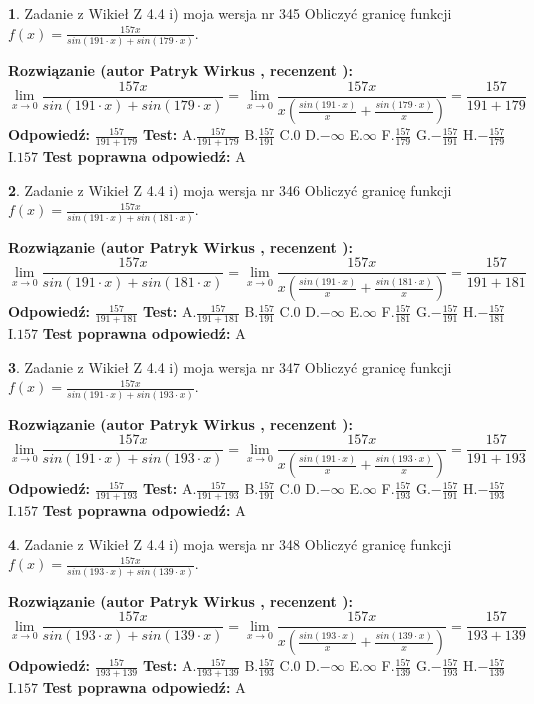 \documentclass[12pt, a4paper]{article}
\theoremstyle{definition} %
\newtheorem{zad}{}
\newcommand{\zadStart}[1]{\begin{zad}#1\newline}
\newcommand{\zadStop}{\end{zad}}
\newcommand{\rozwStart}[2]{\noindent \textbf{Rozwiązanie (autor #1 , recenzent #2): }\newline}
\newcommand{\rozwStop}{\newline}
\newcommand{\odpStart}{\noindent \textbf{Odpowiedź:}\newline}
\newcommand{\odpStop}{\newline}
\newcommand{\testStart}{\noindent \textbf{Test:}\newline}
\newcommand{\testStop}{\newline}
\newcommand{\kluczStart}{\noindent \textbf{Test poprawna odpowiedź:}\newline}
\newcommand{\kluczStop}{\newline}
\begin{document}
\zadStart{Zadanie z Wikieł Z 4.4 i) moja wersja nr 345}
Obliczyć granicę funkcji $f(x)=\frac{157x}{sin(191\cdot x) +sin(179\cdot x)}$.
\zadStop
\rozwStart{Patryk Wirkus}{}
$$\lim\limits_{x\to 0}\frac{157x}{sin(191\cdot x) +sin(179\cdot x)}=\lim\limits_{x\to 0}\frac{157x}{x(\frac{sin(191\cdot x)}{x}+\frac{sin(179\cdot x)}{x})}=\frac{157}{191+179}$$
\rozwStop
\odpStart
$\frac{157}{191+179}$
\odpStop
\testStart
A.$\frac{157}{191+179}$
B.$\frac{157}{191}$
C.$0$
D.$-\infty$
E.$\infty$
F.$\frac{157}{179}$
G.$-\frac{157}{191}$
H.$-\frac{157}{179}$
I.$157$
\testStop
\kluczStart
A
\kluczStop



\zadStart{Zadanie z Wikieł Z 4.4 i) moja wersja nr 346}
Obliczyć granicę funkcji $f(x)=\frac{157x}{sin(191\cdot x) +sin(181\cdot x)}$.
\zadStop
\rozwStart{Patryk Wirkus}{}
$$\lim\limits_{x\to 0}\frac{157x}{sin(191\cdot x) +sin(181\cdot x)}=\lim\limits_{x\to 0}\frac{157x}{x(\frac{sin(191\cdot x)}{x}+\frac{sin(181\cdot x)}{x})}=\frac{157}{191+181}$$
\rozwStop
\odpStart
$\frac{157}{191+181}$
\odpStop
\testStart
A.$\frac{157}{191+181}$
B.$\frac{157}{191}$
C.$0$
D.$-\infty$
E.$\infty$
F.$\frac{157}{181}$
G.$-\frac{157}{191}$
H.$-\frac{157}{181}$
I.$157$
\testStop
\kluczStart
A
\kluczStop



\zadStart{Zadanie z Wikieł Z 4.4 i) moja wersja nr 347}
Obliczyć granicę funkcji $f(x)=\frac{157x}{sin(191\cdot x) +sin(193\cdot x)}$.
\zadStop
\rozwStart{Patryk Wirkus}{}
$$\lim\limits_{x\to 0}\frac{157x}{sin(191\cdot x) +sin(193\cdot x)}=\lim\limits_{x\to 0}\frac{157x}{x(\frac{sin(191\cdot x)}{x}+\frac{sin(193\cdot x)}{x})}=\frac{157}{191+193}$$
\rozwStop
\odpStart
$\frac{157}{191+193}$
\odpStop
\testStart
A.$\frac{157}{191+193}$
B.$\frac{157}{191}$
C.$0$
D.$-\infty$
E.$\infty$
F.$\frac{157}{193}$
G.$-\frac{157}{191}$
H.$-\frac{157}{193}$
I.$157$
\testStop
\kluczStart
A
\kluczStop



\zadStart{Zadanie z Wikieł Z 4.4 i) moja wersja nr 348}
Obliczyć granicę funkcji $f(x)=\frac{157x}{sin(193\cdot x) +sin(139\cdot x)}$.
\zadStop
\rozwStart{Patryk Wirkus}{}
$$\lim\limits_{x\to 0}\frac{157x}{sin(193\cdot x) +sin(139\cdot x)}=\lim\limits_{x\to 0}\frac{157x}{x(\frac{sin(193\cdot x)}{x}+\frac{sin(139\cdot x)}{x})}=\frac{157}{193+139}$$
\rozwStop
\odpStart
$\frac{157}{193+139}$
\odpStop
\testStart
A.$\frac{157}{193+139}$
B.$\frac{157}{193}$
C.$0$
D.$-\infty$
E.$\infty$
F.$\frac{157}{139}$
G.$-\frac{157}{193}$
H.$-\frac{157}{139}$
I.$157$
\testStop
\kluczStart
A
\kluczStop
\end{document}
